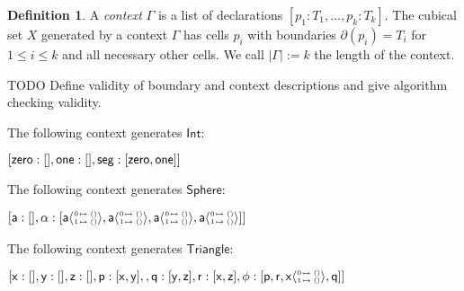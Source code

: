 \documentclass[11pt]{article}
\theoremstyle{definition}
\newtheorem{definition}{Definition}
\newcommand{\continuation}{??}
\newenvironment{examplecontd}[1]
{\renewcommand{\continuation}{\ref{#1}}\expcont[continued]}
{\endexpcont}
\newcommand{\todo}[1]{
  \begin{tcolorbox}
    TODO {#1} 
  \end{tcolorbox}
}
\newcommand{\mdef}{:=}
\newcommand{\mname}[1]{\textit{{#1}}}
\newcommand{\mlist}[1]{[ {#1} ]}
\newcommand{\ctxtdim}[1]{|{#1}|}
\newcommand{\cont}[2]{\ensuremath{ \ifthenelse{\equal{#2}{}}{#1}{{#1}\langle{#2}\rangle}} }
\newcommand{\cset}[1]{\ensuremath{\mathsf{{#1}}}}
\newcommand{\boundary}[1]{\partial({#1})}
\newcommand{\substtwo}[2]{\tiny
  \arraycolsep=.4pt\def\arraystretch{1}
  \begin{array}{ll}
    0 &\mapsto {#1} \\
    1 &\mapsto {#2}
  \end{array}
}
\newcommand{\oneconst}{\substtwo{()}{()}}
\newcommand{\oneid}{\substtwo{0}{1}}
\begin{document}
\begin{definition}
  A \mname{context} $\Gamma$ is a list of declarations $\mlist{ p_1 : T_1 ,
    \ldots , p_k : T_k}$. The cubical set $X$ generated by a context $\Gamma$
  has cells $p_i$ with boundaries $\boundary{p_i} = T_i$ for $1 \leq i \leq k$
  and all necessary other cells. We call $\ctxtdim{\Gamma} \mdef k$ the length
  of the context.
\end{definition}

\todo{Define validity of boundary and context descriptions and give algorithm
  checking validity.
}

\begin{examplecontd}{exp:int}
  The following context generates $\cset{Int}$:
  
  $\mlist{ \cset{zero} : \mlist{} , \cset{one} : \mlist{} , \cset{seg} : \mlist{
      \cont{\cset{zero}}{}, \cont{\cset{one}}{} }}$
\end{examplecontd}

\begin{examplecontd}{exp:sndsphere}
  The following context generates $\cset{Sphere}$:

  $\mlist{ \cset{a} : \mlist{} , \cset{\alpha} : \mlist{ \cont{\cset{a}}{\oneconst} , \cont{\cset{a}}{\oneconst} ,
  \cont{\cset{a}}{\oneconst}, \cont{\cset{a}}{\oneconst} }}$
  
\end{examplecontd}

\begin{examplecontd}{exp:triangle}
  The following context generates $\cset{Triangle}$:
  

  $\mlist{ \cset{x} : \mlist{} , \cset{y} : \mlist{} , \cset{z} : \mlist{} ,
    \cset{p} : \mlist{ \cset{x}, \cset{y}  } ,
    , \cset{q} : \mlist{ \cset{y}, \cset{z} }
    , \cset{r} : \mlist{ \cset{x}, \cset{z} }
    , \cset{\phi} : \mlist{ \cset{p} , \cset{r} ,
      \cont{\cset{x}}{\oneconst}, \cset{q} }
  }$

\end{examplecontd}
\end{document}
